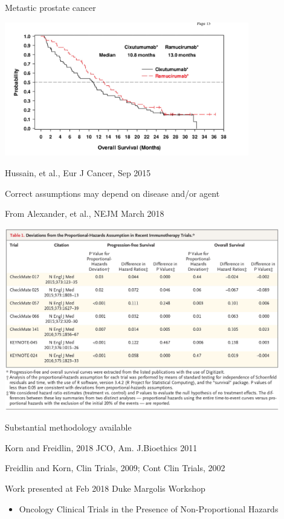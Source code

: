 \documentclass[ignorenonframetext,]{beamer}
\providecommand{\tightlist}{%
  \setlength{\itemsep}{0pt}\setlength{\parskip}{0pt}}
\begin{document}
\begin{frame}{%
\protect\hypertarget{metastic-prostate-cancer}{%
Metastic prostate cancer}}

\includegraphics[width=0.8\textwidth,height=\textheight]{./figures/hussain_survival.jpg}

Hussain, et al., Eur J Cancer, Sep 2015

\end{frame}

\begin{frame}{%
\protect\hypertarget{correct-assumptions-may-depend-on-disease-andor-agent}{%
Correct assumptions may depend on disease and/or agent}}

From Alexander, et al., NEJM March 2018

\includegraphics[width=0.9\textwidth,height=\textheight]{./figures/trippa_table.jpg}

\end{frame}

\begin{frame}{%
\protect\hypertarget{substantial-methodology-available}{%
Substantial methodology available}}

Korn and Freidlin, 2018 JCO, Am. J.Bioethics 2011

Freidlin and Korn, Clin Trials, 2009; Cont Clin Trials, 2002

Work presented at Feb 2018 Duke Margolis Workshop

\begin{itemize}
\tightlist
\item
  Oncology Clinical Trials in the Presence of Non-Proportional Hazards
\end{itemize}

\end{frame}
\end{document}
